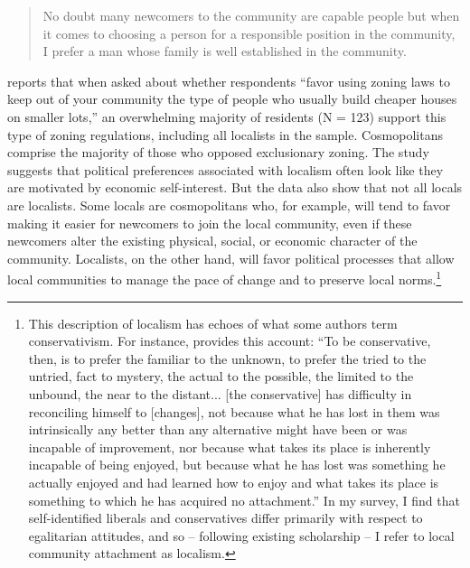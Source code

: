 \documentclass[article,12pt]{memoir}
\begin{document}
  \begin{quote}
  \begin{SingleSpace}
  No doubt many newcomers to the community are capable people but when it comes to choosing a person for a responsible position in the community, I prefer a man whose family is well established in the community.\end{SingleSpace}
  \end{quote}

\noindent\citeauthor{dye_local-cosmopolitan_1963-1} reports that when asked about whether respondents ``favor using zoning laws to keep out of your community the type of people who usually build cheaper houses on smaller lots,'' an overwhelming majority of residents (N = 123) support this type of zoning regulations, including all localists in the sample. Cosmopolitans comprise the majority of those who opposed exclusionary zoning. The study suggests that political preferences associated with localism often look like they are motivated by economic self-interest. But the data also show that not all locals are localists. Some locals are cosmopolitans who, for example, will tend to favor making it easier for newcomers to join the local community, even if these newcomers alter the existing physical, social, or economic character of the community. Localists, on the other hand, will favor political processes that allow local communities to manage the pace of change and to preserve local norms.\footnote{This description of localism has echoes of what some authors term conservativism. For instance, \citet[pp. 408--410]{oakeshott_being_1991} provides this account: ``To be conservative, then, is to prefer the familiar to the unknown, to prefer the tried to the untried, fact to mystery, the actual to the possible, the limited to the unbound, the near to the distant... [the conservative] has difficulty in reconciling himself to [changes], not because what he has lost in them was intrinsically any better than any alternative might have been or was incapable of improvement, nor because what takes its place is inherently incapable of being enjoyed, but because what he has lost was something he actually enjoyed and had learned how to enjoy and what takes its place is something to which he has acquired no attachment.'' In my survey, I find that self-identified liberals and conservatives differ primarily with respect to egalitarian attitudes, and so -- following existing scholarship -- I refer to local community attachment as localism.}
\end{document}
